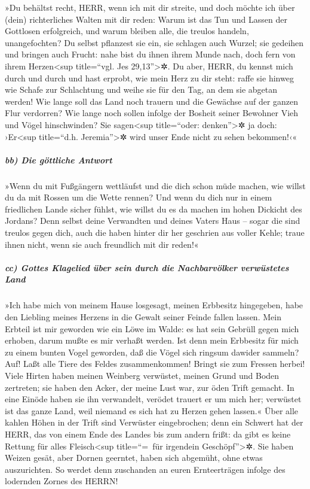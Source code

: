»Du behältst recht, HERR, wenn ich mit dir streite, und
doch möchte ich über (dein) richterliches Walten mit dir reden: Warum
ist das Tun und Lassen der Gottlosen erfolgreich, und warum bleiben
alle, die treulos handeln, unangefochten? Du selbst
pflanzest sie ein, sie schlagen auch Wurzel; sie gedeihen und bringen
auch Frucht: nahe bist du ihnen ihrem Munde nach, doch fern von ihrem
Herzen\textless sup title=``vgl. Jes 29,13''\textgreater✲.
Du aber, HERR, du kennst mich durch und durch und hast
erprobt, wie mein Herz zu dir steht: raffe sie hinweg wie Schafe zur
Schlachtung und weihe sie für den Tag, an dem sie abgetan werden!
Wie lange soll das Land noch trauern und die Gewächse auf
der ganzen Flur verdorren? Wie lange noch sollen infolge der Bosheit
seiner Bewohner Vieh und Vögel hinschwinden? Sie sagen\textless sup
title=``oder: denken''\textgreater✲ ja doch: ›Er\textless sup
title=``d.h. Jeremia''\textgreater✲ wird unser Ende nicht zu sehen
bekommen!‹«

\hypertarget{bb-die-guxf6ttliche-antwort}{%
\subparagraph{bb) Die göttliche
Antwort}\label{bb-die-guxf6ttliche-antwort}}

»Wenn du mit Fußgängern wettläufst und die dich schon müde
machen, wie willst du da mit Rossen um die Wette rennen? Und wenn du
dich nur in einem friedlichen Lande sicher fühlst, wie willst du es da
machen im hohen Dickicht des Jordans? Denn selbst deine
Verwandten und deines Vaters Haus -- sogar die sind treulos gegen dich,
auch die haben hinter dir her geschrien aus voller Kehle; traue ihnen
nicht, wenn sie auch freundlich mit dir reden!«

\hypertarget{cc-gottes-klagelied-uxfcber-sein-durch-die-nachbarvuxf6lker-verwuxfcstetes-land}{%
\subparagraph{cc) Gottes Klagelied über sein durch die Nachbarvölker
verwüstetes
Land}\label{cc-gottes-klagelied-uxfcber-sein-durch-die-nachbarvuxf6lker-verwuxfcstetes-land}}

»Ich habe mich von meinem Hause losgesagt, meinen
Erbbesitz hingegeben, habe den Liebling meines Herzens in die Gewalt
seiner Feinde fallen lassen. Mein Erbteil ist mir geworden
wie ein Löwe im Walde: es hat sein Gebrüll gegen mich erhoben, darum
mußte es mir verhaßt werden. Ist denn mein Erbbesitz für
mich zu einem bunten Vogel geworden, daß die Vögel sich ringsum dawider
sammeln? Auf! Laßt alle Tiere des Feldes zusammenkommen! Bringt sie zum
Fressen herbei! Viele Hirten haben meinen Weinberg
verwüstet, meinen Grund und Boden zertreten; sie haben den Acker, der
meine Lust war, zur öden Trift gemacht. In eine Einöde
haben sie ihn verwandelt, verödet trauert er um mich her; verwüstet ist
das ganze Land, weil niemand es sich hat zu Herzen gehen lassen.«
Über alle kahlen Höhen in der Trift sind Verwüster
eingebrochen; denn ein Schwert hat der HERR, das von einem Ende des
Landes bis zum andern frißt: da gibt es keine Rettung für alles
Fleisch\textless sup title=``=~für irgendein Geschöpf''\textgreater✲.
Sie haben Weizen gesät, aber Dornen geerntet, haben sich
abgemüht, ohne etwas auszurichten. So werdet denn zuschanden an euren
Ernteerträgen infolge des lodernden Zornes des HERRN!

